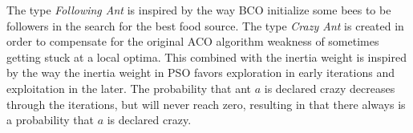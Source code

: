 The type \textit{Following Ant} is inspired by the way BCO initialize some bees to be followers in the search for the best food source. The type \textit{Crazy Ant} is created in order to compensate for the original ACO algorithm weakness of sometimes getting stuck at a local optima. This combined with the inertia weight is inspired by the way the inertia weight in PSO favors exploration in early iterations and exploitation in the later. The probability that ant $a$ is declared crazy decreases through the iterations, but will never reach zero, resulting in that there always is a probability that $a$ is declared crazy. 





